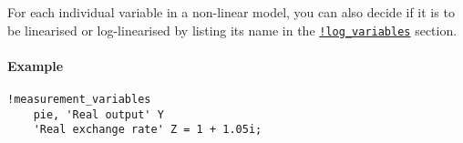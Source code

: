 For each individual variable in a non-linear model, you can also decide
if it is to be linearised or log-linearised by listing its name in the
\href{modellang/logvariables}{\texttt{!log\_variables}} section.

\paragraph{Example}

\begin{verbatim}
!measurement_variables
    pie, 'Real output' Y
    'Real exchange rate' Z = 1 + 1.05i;
\end{verbatim}


